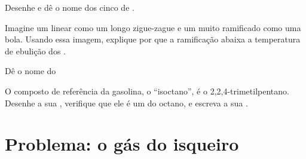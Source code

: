 \begin{exercise}[$\star\star\star$]\label{exo:g11:organic-skeletons:12}
Desenhe e dê o nome dos cinco  de .
\end{exercise}

\begin{exercise}[$\star\star\star$]\label{exo:g11:organic-skeletons:13}
Imagine um  linear como um longo zigue-zague e um  muito
ramificado como uma bola. Usando essa imagem, explique por que a
ramificação abaixa a temperatura de ebulição dos .
\end{exercise}

\begin{exercise}[$\star\star\star$]\label{exo:g11:organic-skeletons:14}
Dê o nome do 
\begin{center}
\end{center}
\end{exercise}

\begin{exercise}[$\star\star\star$]\label{exo:g11:organic-skeletons:15}
O composto de referência da gasolina, o ``isoctano'', é o
2,2,4-trimetilpentano. Desenhe a sua , verifique que ele
é um  do octano, e escreva a sua .
\end{exercise}

\section{Problema: o gás do isqueiro}

